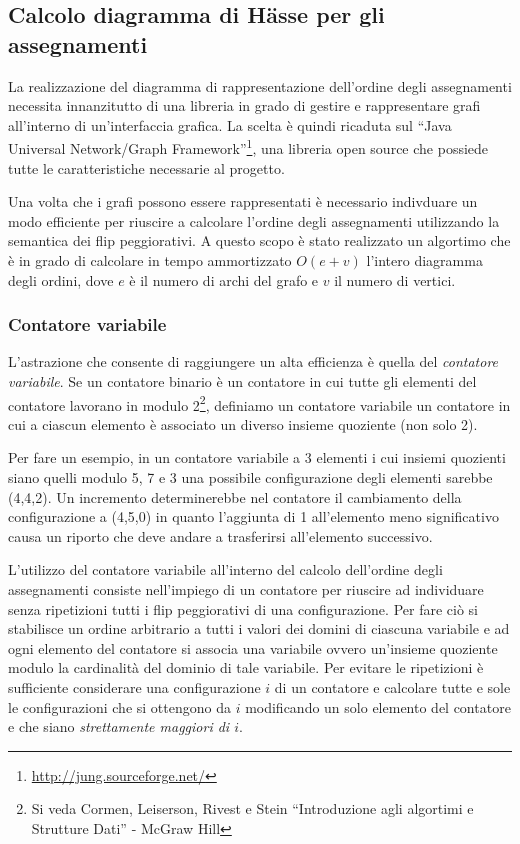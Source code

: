 \subsection{Calcolo diagramma di Hässe per gli assegnamenti}
La realizzazione del diagramma di rappresentazione dell'ordine degli assegnamenti necessita innanzitutto di una libreria in grado di gestire e
rappresentare grafi all'interno di un'interfaccia grafica. La scelta è
quindi ricaduta sul ``Java Universal Network/Graph
Framework''\footnote{\url{http://jung.sourceforge.net/}}, una libreria
open source che possiede tutte le caratteristiche necessarie al
progetto.

Una volta che i grafi possono essere rappresentati è necessario
indivduare un modo efficiente per riuscire a calcolare l'ordine degli assegnamenti utilizzando la semantica dei flip peggiorativi. A questo
scopo è stato realizzato un algortimo che è in grado di calcolare in
tempo ammortizzato $O(e + v)$ l'intero diagramma degli ordini, dove
$e$ è il numero di archi del grafo e $v$ il numero di vertici.

\subsubsection{Contatore variabile}
L'astrazione che consente di raggiungere un alta efficienza è quella
del \textit{contatore variabile}. Se un contatore binario è un
contatore in cui tutte gli elementi del contatore lavorano in modulo
2\footnote{Si veda Cormen, Leiserson, Rivest e Stein ``Introduzione
  agli algortimi e Strutture Dati'' - McGraw Hill}, definiamo un
contatore variabile un contatore in cui a ciascun elemento è associato
un diverso insieme quoziente (non solo 2).

Per fare un esempio, in un contatore variabile a 3 elementi i cui
insiemi quozienti siano quelli modulo 5, 7 e 3 una possibile
configurazione degli elementi sarebbe (4,4,2). Un incremento
determinerebbe nel contatore il cambiamento della configurazione a
(4,5,0) in quanto l'aggiunta di 1 all'elemento meno significativo
causa un riporto che deve andare a trasferirsi all'elemento
successivo.

L'utilizzo del contatore variabile all'interno del calcolo dell'ordine
degli assegnamenti consiste nell'impiego di un contatore per riuscire
ad individuare senza ripetizioni tutti i flip peggiorativi di una
configurazione. Per fare ciò si stabilisce un ordine arbitrario a
tutti i valori dei domini di ciascuna variabile e ad ogni elemento del
contatore si associa una variabile ovvero un'insieme quoziente modulo
la cardinalità del dominio di tale variabile. Per evitare le
ripetizioni è sufficiente considerare una configurazione $i$ di un
contatore e calcolare tutte e sole le configurazioni che si ottengono
da $i$ modificando un solo elemento del contatore e che siano
\textit{strettamente maggiori di $i$}.


